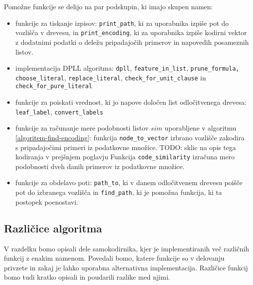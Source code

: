 \documentclass[12pt,a4paper]{article}
\begin{document}

Pomožne funkcije se delijo na par podskupin, ki imajo skupen namen:
\begin{itemize}
	\item funkcije za tiskanje izpisov: \texttt{print\_path}, ki za uporabnika izpiše pot do vozlišča v drevesu, in 
	\texttt{print\_encoding}, ki za uporabnika izpiše kodirni vektor z dodatnimi podatki o deležu pripadajočih primerov in napovedih posameznih listov.

	\item implementacija DPLL algoritma: \texttt{dpll}, \texttt{feature\_in\_list}, \texttt{prune\_formula, choose\_literal}, \texttt{replace\_literal}, \texttt{check\_for\_unit\_clause} in \texttt{check\_for\_pure\_literal}
	
	\item funkcije za poiskati vrednost, ki jo napove določen list odločitvenega drevesa: \texttt{leaf\_label}, \texttt{convert\_labels}
	
	\item funkcije za računanje mere podobnosti listov $sim$ uporabljene v algoritmu \ref{algoritem-find-encoding}: 
	funkcija \texttt{node\_to\_vector} izbrano vozlišče zakodira s pripadajočimi primeri iz podatkovne množice. TODO: sklic na opis tega kodiranja v prejšnjem poglavju %
	Funkcija \texttt{code\_similarity} izračuna mero podobnosti dveh danih primerov iz podatkovne množice.
	
	\item funkcije za obdelavo poti: \texttt{path\_to}, ki v danem odločitvenem drevesu poišče pot do izbranega vozlišča in \texttt{find\_path}, ki je pomožna funkcija, ki ta postopek poenostavi.
\end{itemize}


\subsection{Različice algoritma}

V razdelku bomo opisali dele samokodirnika, kjer je implementiranih več različnih funkcij z enakim namenom.
Povedali bomo, katere funkcije so v delovanju privzete in zakaj je lahko uporabna alternativna implementacija.
Različice funkcij bomo tudi kratko opisali in poudarili razlike med njimi.
\end{document}
